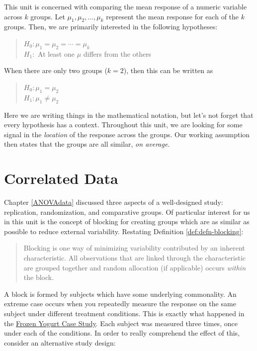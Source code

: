 \documentclass[
]{book}
\theoremstyle{plain}
\theoremstyle{mydefn}
\theoremstyle{myexmpl}
\theoremstyle{remark}
\begin{document}
This unit is concerned with comparing the mean response of a numeric variable across \(k\) groups. Let \(\mu_1, \mu_2, \dotsc, \mu_k\) represent the mean response for each of the \(k\) groups. Then, we are primarily interested in the following hypotheses:

\begin{quote}
\(H_0: \mu_1 = \mu_2 = \dotsb = \mu_k\)\\
\(H_1:\) At least one \(\mu\) differs from the others
\end{quote}

When there are only two groups (\(k = 2\)), then this can be written as

\begin{quote}
\(H_0: \mu_1 = \mu_2\)\\
\(H_1: \mu_1 \neq \mu_2\)
\end{quote}

Here we are writing things in the mathematical notation, but let's not forget that every hypothesis has a context. Throughout this unit, we are looking for some signal in the \emph{location} of the response across the groups. Our working assumption then states that the groups are all similar, \emph{on average}.

\hypertarget{Blockdata}{%
\chapter{Correlated Data}\label{Blockdata}}

Chapter \ref{ANOVAdata} discussed three aspects of a well-designed study: replication, randomization, and comparative groups. Of particular interest for us in this unit is the concept of blocking for creating groups which are as similar as possible to reduce external variability. Restating Definition \ref{def:defn-blocking}:

\begin{quote}
Blocking is one way of minimizing variability contributed by an inherent characteristic. All observations that are linked through the characteristic are grouped together and random allocation (if applicable) occurs \emph{within} the block.
\end{quote}

A block is formed by subjects which have some underlying commonality. An extreme case occurs when you repeatedly measure the response on the same subject under different treatment conditions. This is exactly what happened in the \protect\hyperlink{CaseYogurt}{Frozen Yogurt Case Study}. Each subject was measured three times, once under each of the conditions. In order to really comprehend the effect of this, consider an alternative study design:
\end{document}
